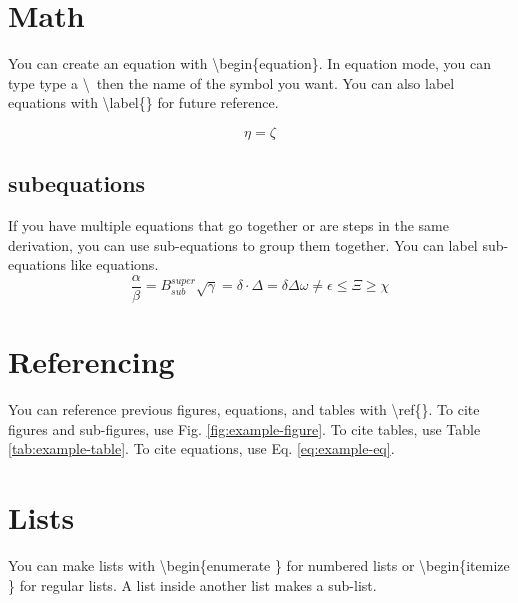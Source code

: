 \documentclass{article}
\begin{document}
\clearpage
\section{Math}
You can create an equation with \textbackslash begin\{equation\}. In equation mode, you can type type a \textbackslash \ then the name of the symbol you want. You can also label equations with \textbackslash label\{\} for future reference.

\begin{equation}
    \label{eq:example-eq}
    \eta = \zeta
\end{equation}

\subsection{subequations}
If you have multiple equations that go together or are steps in the same derivation, you can use sub-equations to group them together. You can label sub-equations like equations.
\begin{subequations}
    \label{eq:example-subeq}
    \begin{equation}
        \frac{\alpha}{\beta} = B^{super}_{sub}
    \end{equation}
    \begin{equation}
        \sqrt{\gamma} = \delta \cdot \Delta = \delta \Delta
    \end{equation}
    \begin{equation}
        \omega \neq \epsilon \leq \Xi \geq \chi
    \end{equation}
\end{subequations}

\section{Referencing}
You can reference previous figures, equations, and tables with \textbackslash ref\{\}. To cite figures and sub-figures, use Fig. \ref{fig:example-figure}. To cite tables, use Table \ref{tab:example-table}. To cite equations, use Eq. \ref{eq:example-eq}.

\clearpage
\section{Lists}
You can make lists with \textbackslash begin\{enumerate \} for numbered lists or \textbackslash begin\{itemize \} for regular lists. A list inside another list makes a sub-list.
\end{document}
